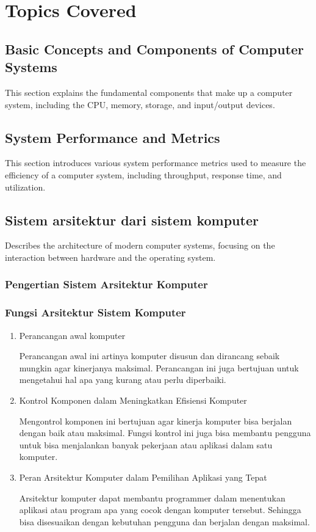 \documentclass[12pt]{article}
\begin{document}
\section{Topics Covered}

\subsection{Basic Concepts and Components of Computer Systems}
This section explains the fundamental components that make up a computer system, including the CPU, memory, storage, and input/output devices.

\subsection{System Performance and Metrics}
This section introduces various system performance metrics used to measure the efficiency of a computer system, including throughput, response time, and utilization.

\subsection{Sistem arsitektur dari sistem komputer}
Describes the architecture of modern computer systems, focusing on the interaction between hardware and the operating system.
\subsubsection{Pengertian Sistem Arsitektur Komputer}
\subsubsection{Fungsi Arsitektur Sistem Komputer}
\begin{enumerate}
    \item Perancangan awal komputer
    \par Perancangan awal ini artinya komputer disusun dan dirancang sebaik mungkin agar kinerjanya maksimal. Perancangan ini juga bertujuan untuk mengetahui hal apa yang kurang atau perlu diperbaiki.
    \item Kontrol Komponen dalam Meningkatkan Efisiensi Komputer
    \par Mengontrol komponen ini bertujuan agar kinerja komputer bisa berjalan dengan baik atau maksimal. Fungsi kontrol ini juga bisa membantu pengguna untuk bisa menjalankan banyak pekerjaan atau aplikasi dalam satu komputer.
    \item Peran Arsitektur Komputer dalam Pemilihan Aplikasi yang Tepat
    \par Arsitektur komputer dapat membantu programmer dalam menentukan aplikasi atau program apa yang cocok dengan komputer tersebut. Sehingga bisa disesuaikan dengan kebutuhan pengguna dan berjalan dengan maksimal.
\end{enumerate}
\end{document}
